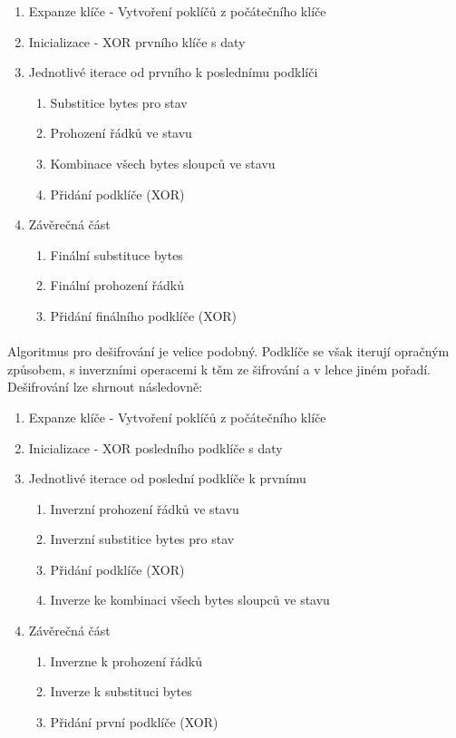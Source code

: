 \documentclass[12pt, a4paper]{article}
\begin{document}
\begin{enumerate}
	\item Expanze klíče - Vytvoření poklíčů z počátečního klíče
	\item Inicializace - XOR prvního klíče s daty
	\item Jednotlivé iterace od prvního k poslednímu podklíči
        \begin{enumerate}
            \item Substitice bytes pro stav
            \item Prohození řádků ve stavu
            \item Kombinace všech bytes sloupců ve stavu
            \item Přidání podklíče (XOR)
        \end{enumerate}
    \item Závěrečná část
        \begin{enumerate}
            \item Finální substituce bytes
            \item Finální prohození řádků
            \item Přidání finálního podklíče (XOR)
        \end{enumerate}
\end{enumerate}

\paragraph{}
Algoritmus pro dešifrování je velice podobný. Podklíče se však iterují opračným způsobem, s inverzními operacemi k těm
ze šifrování a v lehce jiném pořadí. Dešifrování lze shrnout následovně:

\begin{enumerate}
	\item Expanze klíče - Vytvoření poklíčů z počátečního klíče
	\item Inicializace - XOR posledního podklíče s daty
	\item Jednotlivé iterace od poslední podklíče k prvnímu
        \begin{enumerate}
            \item Inverzní prohození řádků ve stavu
            \item Inverzní substitice bytes pro stav
            \item Přidání podklíče (XOR)
            \item Inverze ke kombinaci všech bytes sloupců ve stavu
        \end{enumerate}
    \item Závěrečná část
        \begin{enumerate}
            \item Inverzne k prohození řádků
            \item Inverze k substituci bytes
            \item Přidání první podklíče (XOR)
        \end{enumerate}
\end{enumerate}
\end{document}
